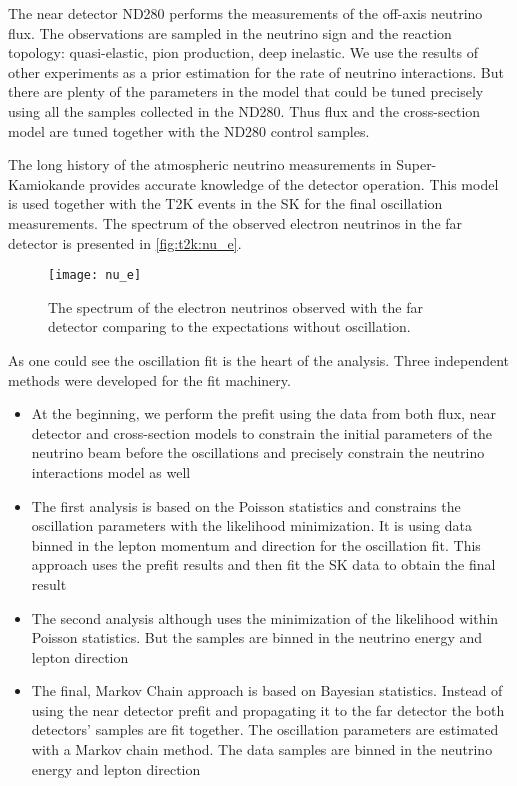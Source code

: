 \documentclass[../main.tex]{subfiles}
\begin{document}
The near detector ND280 performs the measurements of the off-axis neutrino flux. The observations are sampled in the neutrino sign and the reaction topology: quasi-elastic, pion production, deep inelastic. We use the results of other experiments as a prior estimation for the rate of neutrino interactions. But there are plenty of the parameters in the model that could be tuned precisely using all the samples collected in the ND280. Thus flux and the cross-section model are tuned together with the ND280 control samples.

The long history of the atmospheric neutrino measurements in Super-Kamiokande provides accurate knowledge of the detector operation. This model is used together with the T2K events in the SK for the final oscillation measurements. The spectrum of the observed electron neutrinos in the far detector is presented in \autoref{fig:t2k:nu_e}.

\begin{figure}[!ht]
  \centering
  \texttt{[image: nu\_e]}
  \caption{The spectrum of the electron neutrinos observed with the far detector comparing to the expectations without oscillation.}
  \label{fig:t2k:nu_e}
\end{figure}

As one could see the oscillation fit is the heart of the analysis. Three independent methods were developed for the fit machinery.
\begin{itemize}
  \item  At the beginning, we perform the prefit using the data from both flux, near detector and cross-section models to constrain the initial parameters of the neutrino beam before the oscillations and precisely constrain the neutrino interactions model as well
  \item  The first analysis is based on the Poisson statistics and constrains the oscillation parameters with the likelihood minimization. It is using data binned in the lepton momentum and direction for the oscillation fit. This approach uses the prefit results and then fit the SK data to obtain the final result
  \item  The second analysis although uses the minimization of the likelihood within Poisson statistics. But the samples are binned in the neutrino energy and lepton direction
  \item  The final, Markov Chain approach is based on Bayesian statistics. Instead of using the near detector prefit and propagating it to the far detector the both detectors' samples are fit together. The oscillation parameters are estimated with a Markov chain method. The data samples are binned in the neutrino energy and lepton direction
\end{itemize}
\end{document}
